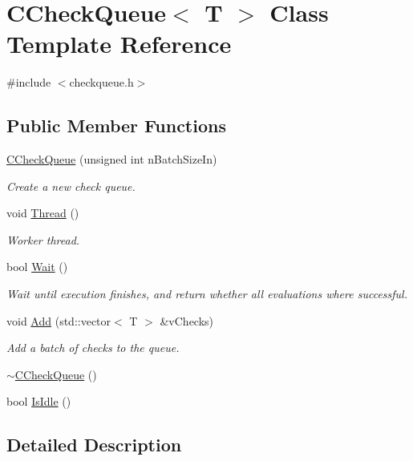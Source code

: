 \hypertarget{class_c_check_queue}{}\section{C\+Check\+Queue$<$ T $>$ Class Template Reference}
\label{class_c_check_queue}


{\ttfamily \#include $<$checkqueue.\+h$>$}

\subsection*{Public Member Functions}
\begin{DoxyCompactItemize}
\item 
\hyperlink{class_c_check_queue_ad0e6a979f8433c05770350bc6b90a849}{C\+Check\+Queue} (unsigned int n\+Batch\+Size\+In)
\begin{DoxyCompactList}\small\item\em Create a new check queue. \end{DoxyCompactList}\item 
void \hyperlink{class_c_check_queue_ad3602cd305b07612e634363b31c1d46c}{Thread} ()
\begin{DoxyCompactList}\small\item\em Worker thread. \end{DoxyCompactList}\item 
bool \hyperlink{class_c_check_queue_a4ff3e0e8241491efa1803eeb3a53e7fa}{Wait} ()
\begin{DoxyCompactList}\small\item\em Wait until execution finishes, and return whether all evaluations where successful. \end{DoxyCompactList}\item 
void \hyperlink{class_c_check_queue_aee8e83bcdeef17740937e6c1dc84c478}{Add} (std\+::vector$<$ T $>$ \&v\+Checks)
\begin{DoxyCompactList}\small\item\em Add a batch of checks to the queue. \end{DoxyCompactList}\item 
\hyperlink{class_c_check_queue_a05820838bd337f6e882ad21ac590d524}{$\sim$\+C\+Check\+Queue} ()
\item 
bool \hyperlink{class_c_check_queue_a3c091928859b0936331341edeb977325}{Is\+Idle} ()
\end{DoxyCompactItemize}


\subsection{Detailed Description}
